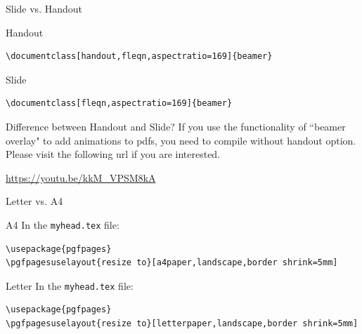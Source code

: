 \documentclass[handout,fleqn,aspectratio=169]{beamer}
\begin{document}
\begin{frame}[fragile]{Slide vs. Handout}

\plitemsep 0.1in

\bci 

\item Handout

\begin{verbatim}
\documentclass[handout,fleqn,aspectratio=169]{beamer}
\end{verbatim}

\item Slide
\begin{verbatim}
\documentclass[fleqn,aspectratio=169]{beamer}
\end{verbatim}

\item Difference between Handout and Slide? If you use the functionality of ``beamer overlay" to add animations to pdfs, you need to compile without handout option. Please visit the following url if you are interested. 

\medskip
\url{https://youtu.be/kkM_VPSM8kA}

\eci
\end{frame}

\begin{frame}[fragile]{Letter vs. A4}

\plitemsep 0.1in

\bci 

\item A4
In the {\tt myhead.tex} file:

\begin{verbatim}
\usepackage{pgfpages}
\pgfpagesuselayout{resize to}[a4paper,landscape,border shrink=5mm]
\end{verbatim}

\item Letter
In the {\tt myhead.tex} file:

\begin{verbatim}
\usepackage{pgfpages}
\pgfpagesuselayout{resize to}[letterpaper,landscape,border shrink=5mm]
\end{verbatim}


\eci
\end{frame}





\end{document}
